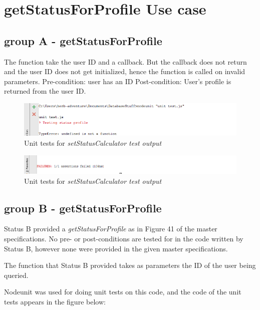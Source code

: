 \documentclass[a4paper,12pt]{article}
\begin{document}
\newpage
\section{getStatusForProfile Use case}
\subsection{group A - getStatusForProfile}
The function take the user ID and a callback. But the callback does not return and the user ID does not get initialized, hence the function is called on invalid parameters.
Pre-condition: user has an ID
Post-condition: User's profile is returned from the user ID.
	\begin{figure}
		\includegraphics[width=1.0\textwidth]{Figures/get_status_profile.PNG}
		\caption{Unit tests for \textit{setStatusCalculator test output}}
	\end{figure}

	\begin{figure}
		\includegraphics[width=1.0\textwidth]{Figures/get_status_profile2.PNG}
		\caption{Unit tests for \textit{setStatusCalculator test output}}
	\end{figure}



\subsection{group B - getStatusForProfile}
Status B provided a \textit{getStatusForProfile} as in Figure 41 of the master specifications. No pre- or post-conditions are tested for in the code written by Status B, however none were provided in the given master specifications.

The function that Status B provided takes as parameters the ID of the user being queried.

Nodeunit was used for doing unit tests on this code, and the code of the unit tests appears in the figure below:
\end{document}
